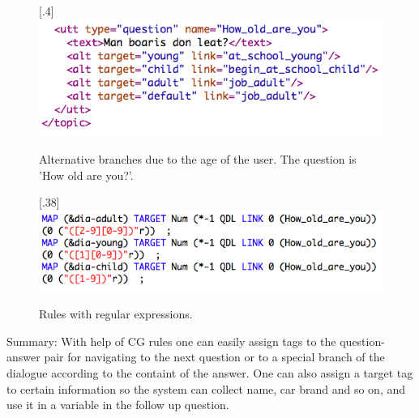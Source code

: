 \documentclass[11pt]{article}
\begin{document}
\begin{figure}[htbp]
\begin{center}
\scalebox{.4}[.4]{\includegraphics{presentation/img/age_branching.png}}\\
\caption{Alternative branches due to the age of the user. The question is 'How old are you?'.}
\label{agebranches}
\end{center}
\end{figure}

\begin{figure}[htbp]
\begin{center}
\scalebox{.38}[.38]{\includegraphics{presentation/img/agerules.png}}\\
\caption{Rules with regular expressions.}
\label{agerule}
\end{center}
\end{figure}

Summary: With help of CG rules one can easily assign tags to the question-answer pair for navigating to the next question or to a special branch of the dialogue according to the containt of the answer. One can also assign a target tag to certain information so the system can collect name, car brand and so on, and use it in a variable in the follow up question.
 
\end{document}
